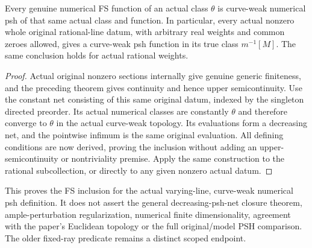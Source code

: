 \begin{theorem}
\label{thm:native-numerical-fs-is-curve-weak-psh}
\leanok
{}
Every genuine numerical FS function of an actual class $\theta$ is
curve-weak numerical psh of that same actual class and function. In
particular, every actual nonzero whole original rational-line datum,
with arbitrary real weights and common zeroes allowed, gives a
curve-weak psh function in its true class $m^{-1}[M]$. The same conclusion
holds for actual rational weights.
\end{theorem}
\begin{proof}
Actual original nonzero sections internally give genuine generic
finiteness, and the preceding theorem gives continuity and hence upper
semicontinuity. Use the constant net consisting of this same original
datum, indexed by the singleton directed preorder. Its actual numerical
classes are constantly $\theta$ and therefore converge to $\theta$ in
the actual curve-weak topology. Its evaluations form a decreasing net,
and the pointwise infimum is the same original evaluation. All defining
conditions are now derived, proving the inclusion without adding an
upper-semicontinuity or nontriviality premise. Apply the same construction
to the rational subcollection, or directly to any given nonzero actual
datum.
\end{proof}

\begin{remark}
This proves the FS inclusion for the actual varying-line, curve-weak
numerical psh definition. It does not assert the general decreasing-psh-net
closure theorem, ample-perturbation regularization, numerical finite
dimensionality, agreement with the paper's Euclidean topology or the
full original/model PSH comparison. The older fixed-ray predicate remains
a distinct scoped endpoint.
\end{remark}
